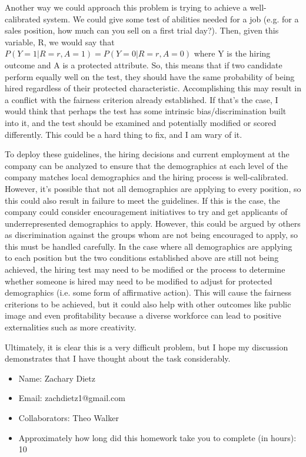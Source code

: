 \documentclass[submit]{harvardml}
\begin{document}
Another way we could approach this problem is trying to achieve a well-calibrated system. We could give some test of abilities needed for a job (e.g. for a sales position, how much can you sell on a first trial day?). Then, given this variable, R, we would say that $P(Y=1|R = r, A = 1) = P(Y=0|R = r,A = 0) $ where Y is the hiring outcome and A is a protected attribute. So, this means that if two candidate perform equally well on the test, they should have the same probability of being hired regardless of their protected characteristic. Accomplishing this may result in a conflict with the fairness criterion already established. If that's the case, I would think that perhaps the test has some intrinsic bias/discrimination built into it, and the test should be examined and potentially modified or scored differently. This could be a hard thing to fix, and I am wary of it.

To deploy these guidelines, the hiring decisions and current employment at the company can be analyzed to ensure that the demographics at each level of the company matches local demographics and the hiring process is well-calibrated. However, it's possible that not all demographics are applying to every position, so this could also result in failure to meet the guidelines. If this is the case, the company could consider encouragement initiatives to try and get applicants of underrepresented demographics to apply. However, this could be argued by others as discrimination against the groups whom are not being encouraged to apply, so this must be handled carefully. In the case where all demographics are applying to each position but the two conditions established above are still not being achieved, the hiring test may need to be modified or the process to determine whether someone is hired may need to be modified to adjust for protected demographics (i.e. some form of affirmative action). This will cause the fairness criterions to be achieved, but it could also help with other outcomes like public image and even profitability because a diverse workforce can lead to positive externalities such as more creativity.

Ultimately, it is clear this is a very difficult problem, but I hope my discussion demonstrates that I have thought about the task considerably.

\newpage

\begin{itemize}
    \item Name: Zachary Dietz
    \item Email: zachdietz1@gmail.com
    \item Collaborators: Theo Walker
    \item Approximately how long did this homework take you to complete (in hours):   10
\end{itemize}
\end{document}
